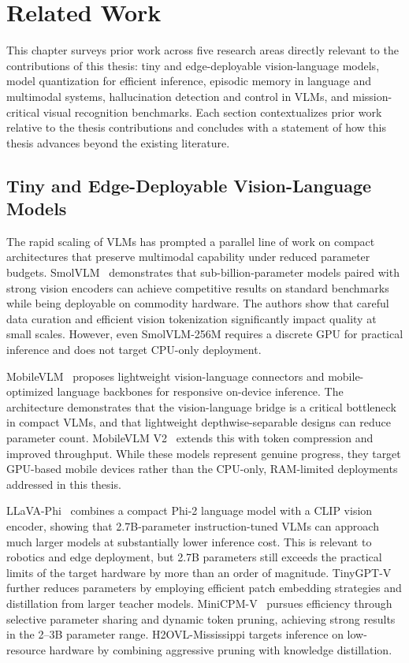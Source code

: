 \chapter{Related Work}
\label{cha:related}

This chapter surveys prior work across five research areas directly relevant to the contributions of this thesis: tiny and edge-deployable vision-language models, model quantization for efficient inference, episodic memory in language and multimodal systems, hallucination detection and control in VLMs, and mission-critical visual recognition benchmarks. Each section contextualizes prior work relative to the thesis contributions and concludes with a statement of how this thesis advances beyond the existing literature.

\section[Tiny and Edge-Deployable VLMs]{Tiny and Edge-Deployable Vision-Language Models}
\label{sec:related_tiny_vlm}

The rapid scaling of VLMs has prompted a parallel line of work on compact architectures that preserve multimodal capability under reduced parameter budgets. SmolVLM~\cite{smolvlm2024} demonstrates that sub-billion-parameter models paired with strong vision encoders can achieve competitive results on standard benchmarks while being deployable on commodity hardware. The authors show that careful data curation and efficient vision tokenization significantly impact quality at small scales. However, even SmolVLM-256M requires a discrete GPU for practical inference and does not target CPU-only deployment.

MobileVLM~\cite{chu2023mobilevlm} proposes lightweight vision-language connectors and mobile-optimized language backbones for responsive on-device inference. The architecture demonstrates that the vision-language bridge is a critical bottleneck in compact VLMs, and that lightweight depthwise-separable designs can reduce parameter count. MobileVLM V2~\cite{chu2024mobilevlmv2} extends this with token compression and improved throughput. While these models represent genuine progress, they target GPU-based mobile devices rather than the CPU-only, RAM-limited deployments addressed in this thesis.

LLaVA-Phi~\cite{zhu2024llavaphi} combines a compact Phi-2 language model with a CLIP vision encoder, showing that 2.7B-parameter instruction-tuned VLMs can approach much larger models at substantially lower inference cost. This is relevant to robotics and edge deployment, but 2.7B parameters still exceeds the practical limits of the target hardware by more than an order of magnitude. TinyGPT-V~\cite{yuan2024tinygptv} further reduces parameters by employing efficient patch embedding strategies and distillation from larger teacher models. MiniCPM-V~\cite{hu2024minicpmv} pursues efficiency through selective parameter sharing and dynamic token pruning, achieving strong results in the 2--3B parameter range. H2OVL-Mississippi targets inference on low-resource hardware by combining aggressive pruning with knowledge distillation.

